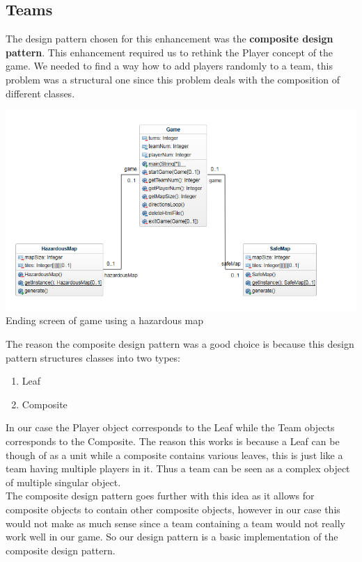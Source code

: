 \documentclass[a4paper,12pt]{extarticle}
\begin{document}
\newpage
\subsection{Teams}
The design pattern chosen for this enhancement was the \textbf{composite design pattern}. This enhancement required us to rethink the Player concept of the game. We needed to find a way how to add players randomly to a team, this problem was a structural one since this problem deals with the composition of different classes.\\

\begin{center}
\includegraphics[scale=0.5]{Enhancement2CD.png}\\
Ending screen of game using a hazardous map
\end{center}

\noindent The reason the composite design pattern was a good choice is because this design pattern structures classes into two types:\\

\begin{enumerate}
\item Leaf
\item Composite
\end{enumerate}

\noindent In our case the Player object corresponds to the Leaf while the Team objects  corresponds to the Composite. The reason this works is because a Leaf can be though of as a unit while a composite contains various leaves, this is just like a team having multiple players in it. Thus a team can be seen as a complex object of multiple singular object.\\

\noindent The composite design pattern goes further with this idea as it allows for composite objects to contain other composite objects, however in our case this would not make as much sense since a team containing a team would not really work well in our game. So our design pattern is a basic implementation of the composite design pattern.\\
\end{document}

